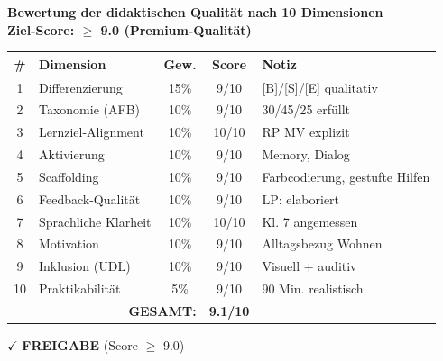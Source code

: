 \documentclass[11pt,a4paper]{article}
\begin{document}
\begin{scorebox}
\textbf{Bewertung der didaktischen Qualität nach 10 Dimensionen}\\
\textbf{Ziel-Score: $\geq$ 9.0 (Premium-Qualität)}

\vspace{1em}
\begin{tabular}{|c|l|c|c|p{4cm}|}
\hline
\textbf{\#} & \textbf{Dimension} & \textbf{Gew.} & \textbf{Score} & \textbf{Notiz} \\
\hline
1 & Differenzierung & 15\% & 9/10 & [B]/[S]/[E] qualitativ \\
\hline
2 & Taxonomie (AFB) & 10\% & 9/10 & 30/45/25 erfüllt \\
\hline
3 & Lernziel-Alignment & 10\% & 10/10 & RP MV explizit \\
\hline
4 & Aktivierung & 10\% & 9/10 & Memory, Dialog \\
\hline
5 & Scaffolding & 10\% & 9/10 & Farbcodierung, gestufte Hilfen \\
\hline
6 & Feedback-Qualität & 10\% & 9/10 & LP: elaboriert \\
\hline
7 & Sprachliche Klarheit & 10\% & 10/10 & Kl. 7 angemessen \\
\hline
8 & Motivation & 10\% & 9/10 & Alltagsbezug Wohnen \\
\hline
9 & Inklusion (UDL) & 10\% & 9/10 & Visuell + auditiv \\
\hline
10 & Praktikabilität & 5\% & 9/10 & 90 Min. realistisch \\
\hline
\multicolumn{3}{|r|}{\textbf{GESAMT:}} & \textbf{9.1/10} & \\
\hline
\end{tabular}

\vspace{1em}
$\checkmark$ \textcolor{successgreen}{\textbf{FREIGABE} (Score $\geq$ 9.0)}
\end{scorebox}
\end{document}
